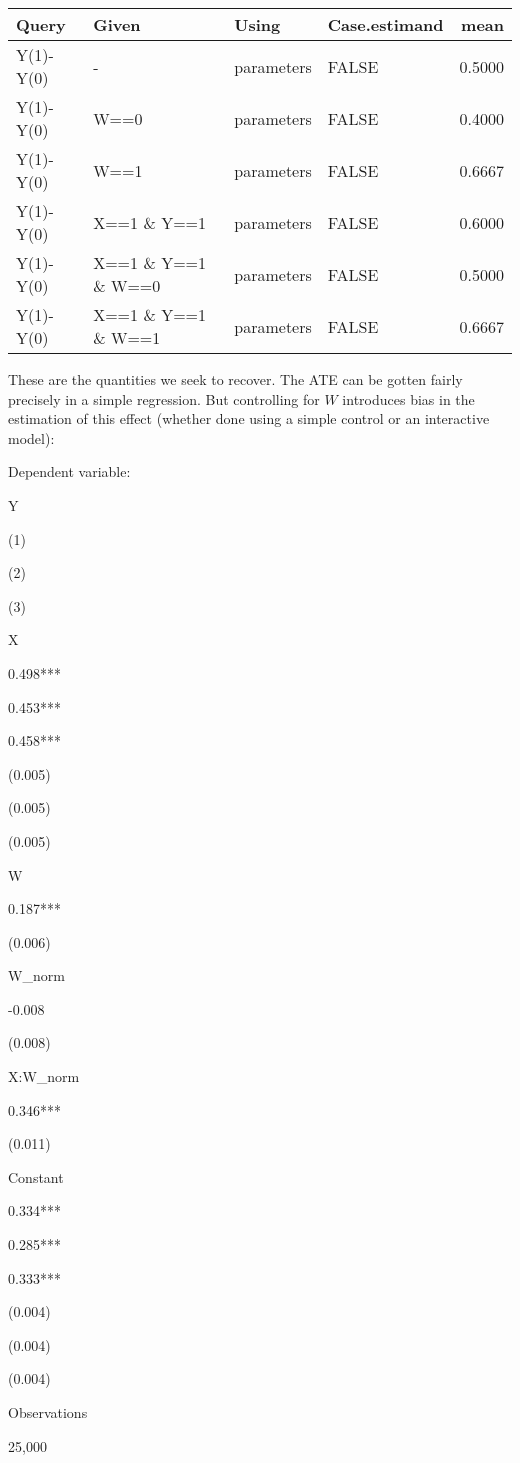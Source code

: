 \documentclass[
  12pt,
]{book}
\begin{document}
\begin{tabular}{l|l|l|l|r}
\hline
Query & Given & Using & Case.estimand & mean\\
\hline
Y(1)-Y(0) & - & parameters & FALSE & 0.5000\\
\hline
Y(1)-Y(0) & W==0 & parameters & FALSE & 0.4000\\
\hline
Y(1)-Y(0) & W==1 & parameters & FALSE & 0.6667\\
\hline
Y(1)-Y(0) & X==1 \& Y==1 & parameters & FALSE & 0.6000\\
\hline
Y(1)-Y(0) & X==1 \& Y==1 \& W==0 & parameters & FALSE & 0.5000\\
\hline
Y(1)-Y(0) & X==1 \& Y==1 \& W==1 & parameters & FALSE & 0.6667\\
\hline
\end{tabular}

These are the quantities we seek to recover. The ATE can be gotten fairly precisely in a simple regression. But controlling for \(W\) introduces bias in the estimation of this effect (whether done using a simple control or an interactive model):

Dependent variable:

Y

(1)

(2)

(3)

X

0.498***

0.453***

0.458***

(0.005)

(0.005)

(0.005)

W

0.187***

(0.006)

W\_norm

-0.008

(0.008)

X:W\_norm

0.346***

(0.011)

Constant

0.334***

0.285***

0.333***

(0.004)

(0.004)

(0.004)

Observations

25,000
\end{document}
